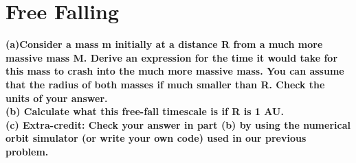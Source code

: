 \documentclass[paper=a4, fontsize=11pt]{scrartcl} %
\numberwithin{equation}{section} %
\numberwithin{figure}{section} %
\numberwithin{table}{section} %
\begin{document}
\section{Free Falling}
\textbf{(a)Consider a mass m initially at a distance R from a much more massive mass M. Derive
an expression for the time it would take for this mass to crash into the much more massive mass. You can assume that the radius of both masses if much smaller than R. Check the
units of your answer.}\\
\textbf{(b) Calculate what this free-fall timescale is if R is 1 AU.}\\
\textbf{(c) Extra-credit: Check your answer in part (b) by using the numerical orbit simulator
(or write your own code) used in our previous problem.}
\end{document}
